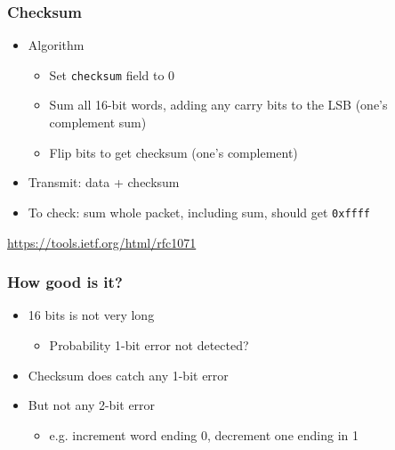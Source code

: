 \subsubsection{Checksum}
\begin{itemize}[nosep]
    \item Algorithm
          \begin{itemize}[nosep]
              \item Set \texttt{checksum} field to 0
              \item Sum all 16-bit words, adding any carry bits to the LSB (one's complement sum)
              \item Flip bits to get checksum (one's complement)
          \end{itemize}
    \item Transmit: data + checksum
    \item To check: sum whole packet, including sum, should get \texttt{0xffff}
\end{itemize}
\url{https://tools.ietf.org/html/rfc1071}
\subsubsection{How good is it?}
\begin{itemize}[nosep]
    \item 16 bits is not very long
          \begin{itemize}[nosep]
              \item Probability 1-bit error not detected?
          \end{itemize}
    \item Checksum does catch any 1-bit error
    \item But not any 2-bit error
          \begin{itemize}[nosep]
              \item e.g. increment word ending 0, decrement one ending in 1
          \end{itemize}
\end{itemize}

